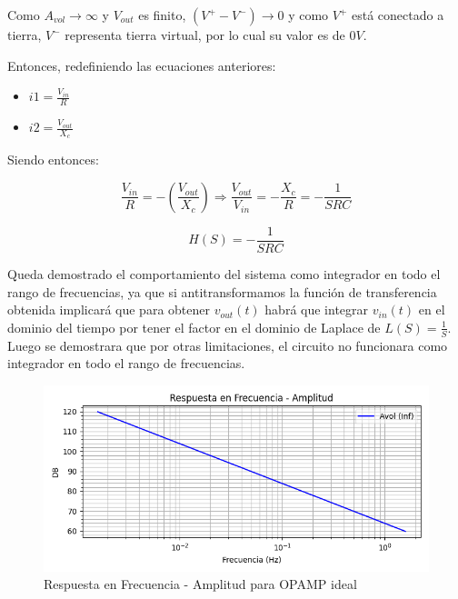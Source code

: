 Como ${A_{vol} \to \infty}$ y $V_{out}$ es finito, ${(V^{+}-V^{-}) \to 0}$ y como $V^{+}$ está conectado a tierra,
$V^{-}$ representa tierra virtual, por lo cual su valor es de $0V$.

Entonces, redefiniendo las ecuaciones anteriores:

\begin{itemize}
	\item $i1 = \frac{V_{in}}{R} $
	\item $i2 = \frac {V_{out}}{X_c}$
\end{itemize}

Siendo entonces:

$$ \frac{V_{in}}{R} = - (\frac{V_{out}}{X_c}) \Longrightarrow \frac{V_{out}}{V_{in}} = -\frac{X_c}{R} = - \frac{1}{SRC}$$

$$ H(S) = - \frac{1}{SRC}$$

Queda demostrado el comportamiento del sistema como integrador en todo el rango de frecuencias, ya que si antitransformamos la función de transferencia
obtenida implicará que para obtener $v_{out}(t)$ habrá que integrar $v_{in}(t)$ en el dominio del tiempo por tener el factor en el dominio de Laplace de $L(S)=\frac{1}{S}$.
Luego se demostrara que por otras limitaciones, el circuito no funcionara como integrador en todo el rango de frecuencias.

\begin{figure}[H]
    \centering 
    \includegraphics [scale=1] {../Ejercicio3-CircuitoIntegradoresyDerivadores/Imagenes/teorico-avol-inf-integrador-amplitud.png} 
    \caption{Respuesta en Frecuencia - Amplitud para OPAMP ideal}
    \label{fig:emptyPlotTool}
\end{figure}

